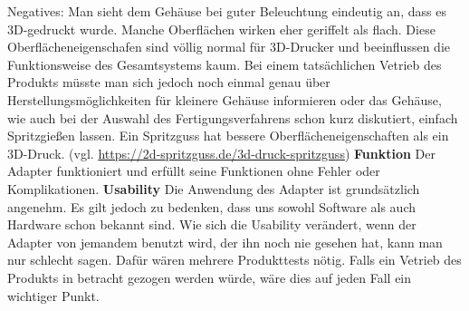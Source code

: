 \documentclass[11pt, twoside]{article}
\begin{document}
Negatives:\newline
Man sieht dem Gehäuse bei guter Beleuchtung eindeutig an, dass es 3D-gedruckt wurde. Manche Oberflächen wirken eher geriffelt als flach. Diese Oberflächeneigenschafen sind völlig normal für 3D-Drucker und beeinflussen die Funktionsweise des Gesamtsystems kaum. Bei einem tatsächlichen Vetrieb des Produkts müsste man sich jedoch noch einmal genau über Herstellungsmöglichkeiten für kleinere Gehäuse informieren oder das Gehäuse, wie auch bei der Auswahl des Fertigungsverfahrens schon kurz diskutiert, einfach Spritzgießen lassen. Ein Spritzguss hat bessere Oberflächeneigenschaften als ein 3D-Druck.
\vspace{4mm}\newline
(vgl. \url{https://2d-spritzguss.de/3d-druck-spritzguss})
\vspace{4mm}\newline
\textbf{Funktion}\newline
Der Adapter funktioniert und erfüllt seine Funktionen ohne Fehler oder Komplikationen.
\vspace{4mm}\newline
\textbf{Usability}\newline
Die Anwendung des Adapter ist grundsätzlich angenehm. Es gilt jedoch zu bedenken, dass uns sowohl Software als auch Hardware schon bekannt sind. Wie sich die Usability verändert, wenn der Adapter von jemandem benutzt wird, der ihn noch nie gesehen hat, kann man nur schlecht sagen. Dafür wären mehrere Produkttests nötig. Falls ein Vetrieb des Produkts in betracht gezogen werden würde, wäre dies auf jeden Fall ein wichtiger Punkt.\newline
\end{document}
